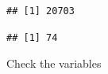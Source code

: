\begin{verbatim}
## [1] 20703
\end{verbatim}

\begin{Shaded}
\begin{Highlighting}[]
\end{Highlighting}
\end{Shaded}

\begin{verbatim}
## [1] 74
\end{verbatim}

Check the variables

\begin{Shaded}
\begin{Highlighting}[]
\end{Highlighting}
\end{Shaded}

